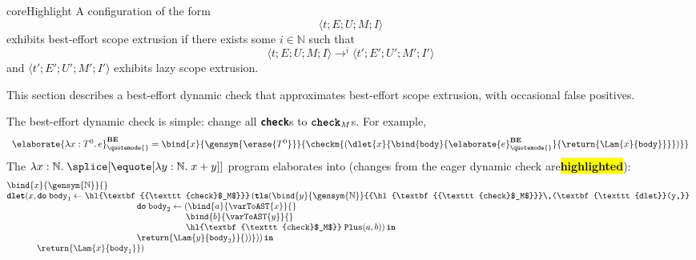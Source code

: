 \begin{definition}{coreHighlight} A \coreLang{} configuration of the form 
\[\langle t;E;U;M;I\rangle\]  
exhibits best-effort scope extrusion if there exists some $i \in \mathbb{N}$ such that 
\[ \langle t;E;U;M;I\rangle \to^{i} \langle t';E';U';M';I'\rangle\]
and $\langle t';E';U';M';I'\rangle$ exhibits lazy scope extrusion.
\end{definition}

This section describes a best-effort dynamic check that approximates best-effort scope extrusion, with occasional false positives. 

The best-effort dynamic check is simple: change all \textbf{\texttt{check}}s to $\textbf{\texttt{check}}_M$s. For example, 
{
  \footnotesize
\[
\begin{array}{rcl}
\elaborate{\lambda x: T^0. \, e}_{\quotemode{}}^{\textbf{BE}} = \bind{x}{\gensym{\erase{T^0}}}{\checkm{(\dlet{x}{\bind{\texttt{body}}{\elaborate{e}_{\quotemode{}}^\textbf{BE}}{\return{\Lam{x}{\texttt{body}}}}})}}
\end{array}\]
}
The $\lambda x:\mathbb{N}. \; \splice[{\equote[\lambda{y}: \mathbb{N}. \; x+y]}]$ program elaborates into (changes from the eager dynamic check are\textbf{\hl{highlighted}}):
{
\[\begin{array}{@{}l}
  \bind{x}{\gensym{\mathbb{N}}}{} \\
  {\textbf{\texttt{dlet}}(}{x}, \textbf{\texttt{do}} \; {\texttt{body}_1} \leftarrow {{\hl{\textbf{{\texttt{check}$_M$}}}}}\,(\textbf{\texttt{tls}}({\bind{y}{\gensym{\mathbb{N}}}{{\hl{\textbf{{\texttt{check}$_M$}}}\,(\textbf{\texttt{dlet}}(y,}}} \\
    \quad\quad\quad\quad\quad\quad\quad
    \quad\quad\quad\quad\quad\quad\quad\;\;\,\,
    \textbf{\texttt{do}}\;{\texttt{body}_2} \leftarrow {(\bind{a}{\varToAST{x}}{}}\\
    \quad\quad\quad\quad\quad\quad\quad
    \quad\quad\quad\quad\quad\quad\quad
    \quad\quad\quad\quad\quad\quad\,\,\,
    \bind{b}{\varToAST{y}}{}\\
     \quad\quad\quad\quad\quad\quad\quad
    \quad\quad\quad\quad\quad\quad\quad
    \quad\quad\quad\quad\quad\quad\,\,\,
    \hl{\textbf{\texttt{check}$_M$}}\;{\texttt{Plus}(a, b)}) \, \textbf{\texttt{in}}\\
    \quad\quad\quad\quad\quad\quad\quad
    \quad\quad\quad\quad\quad\quad\quad\;\;\,\,
    \return{\Lam{y}{\texttt{body}_2}}{{))}})) \, \textbf{\texttt{in}}\\
  \quad\quad\quad\;\, {\return{\Lam{x}{\texttt{body}_1}}})
\end{array}\]
}

